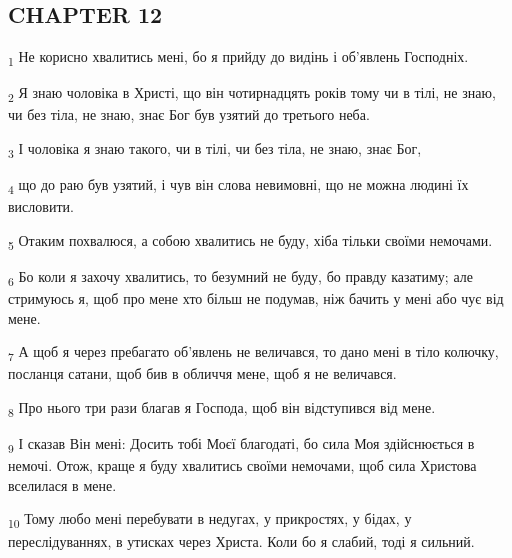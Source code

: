 \subsection{CHAPTER 12}
\begin{tcolorbox}
\textsubscript{1} Не корисно хвалитись мені, бо я прийду до видінь і об'явлень Господніх.
\end{tcolorbox}
\begin{tcolorbox}
\textsubscript{2} Я знаю чоловіка в Христі, що він чотирнадцять років тому чи в тілі, не знаю, чи без тіла, не знаю, знає Бог був узятий до третього неба.
\end{tcolorbox}
\begin{tcolorbox}
\textsubscript{3} І чоловіка я знаю такого, чи в тілі, чи без тіла, не знаю, знає Бог,
\end{tcolorbox}
\begin{tcolorbox}
\textsubscript{4} що до раю був узятий, і чув він слова невимовні, що не можна людині їх висловити.
\end{tcolorbox}
\begin{tcolorbox}
\textsubscript{5} Отаким похвалюся, а собою хвалитись не буду, хіба тільки своїми немочами.
\end{tcolorbox}
\begin{tcolorbox}
\textsubscript{6} Бо коли я захочу хвалитись, то безумний не буду, бо правду казатиму; але стримуюсь я, щоб про мене хто більш не подумав, ніж бачить у мені або чує від мене.
\end{tcolorbox}
\begin{tcolorbox}
\textsubscript{7} А щоб я через пребагато об'явлень не величався, то дано мені в тіло колючку, посланця сатани, щоб бив в обличчя мене, щоб я не величався.
\end{tcolorbox}
\begin{tcolorbox}
\textsubscript{8} Про нього три рази благав я Господа, щоб він відступився від мене.
\end{tcolorbox}
\begin{tcolorbox}
\textsubscript{9} І сказав Він мені: Досить тобі Моєї благодаті, бо сила Моя здійснюється в немочі. Отож, краще я буду хвалитись своїми немочами, щоб сила Христова вселилася в мене.
\end{tcolorbox}
\begin{tcolorbox}
\textsubscript{10} Тому любо мені перебувати в недугах, у прикростях, у бідах, у переслідуваннях, в утисках через Христа. Коли бо я слабий, тоді я сильний.
\end{tcolorbox}
